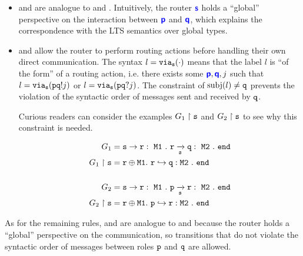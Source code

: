 \begin{itemize}

\item {} and  are
analogue to  and .
Intuitively, the router $\role{s}$ holds a
``global'' perspective on the interaction
between $\role{p}$ and $\role{q}$, which explains
the correspondence with the LTS semantics over global
types.

\item {} and  allow
the router to perform routing actions before handling
their own direct communication. The syntax $l = \via{s}{\cdot}$
means that the label $l$ is ``of the form'' of a routing
action, i.e. there exists some $\role{p}, \role{q}, j$
such that $l = \via{s}{\aout{p}{q}{j}}$ or 
$l = \via{s}{\ain{p}{q}{j}}$.
The constraint of $\subj{l} \neq \mrole{q}$
prevents the violation of the syntactic order of messages
sent and received by $\mrole{q}$.

Curious readers can consider the examples 
$\proj{G_1}{s}$ and $\proj{G_2}{s}$
to see why this constraint is needed.

\begin{align*}
G_1 &= \gcommone{s}{r}{\tmsg{M1}}.~ \grouteone{r}{q}{s}{\tmsg{M2}}.~ \tend \\
\proj{G_1}{s} &= \tselone{r}{\tmsg{M1}}. ~ 
	\routerone{r}{q}{\tmsg{M2}}{\tend} \\~\\
G_2 &= \gcommone{s}{r}{\tmsg{M1}}.~ \grouteone{p}{r}{s}{\tmsg{M2}}.~ \tend \\
\proj{G_2}{s} &= \tselone{r}{\tmsg{M1}}. ~ 
	\routerone{p}{r}{\tmsg{M2}}{\tend} \\
\end{align*}

\end{itemize}

As for the remaining rules,
 and  are analogue to
 and  because the router
holds a ``global'' perspective on the communication,
so transitions that do not violate the syntactic order
of messages between roles $\mrole{p}$ and $\mrole{q}$
are allowed.
